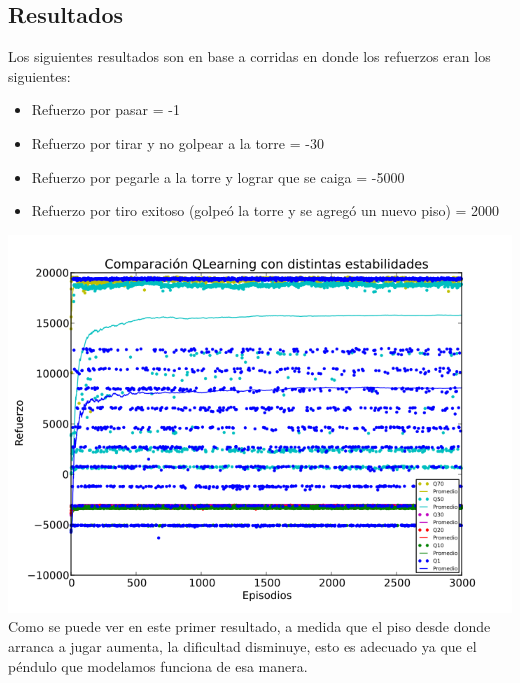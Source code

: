 \documentclass[11pt, a4paper]{article}
\begin{document}
\newpage

\subsection{Resultados}

Los siguientes resultados son en base a corridas en donde los refuerzos eran los siguientes:
\begin{itemize}
\item Refuerzo por pasar = -1
\item Refuerzo por tirar y no golpear a la torre = -30
\item Refuerzo por pegarle a la torre y lograr que se caiga = -5000
\item Refuerzo por tiro exitoso (golpe\'o la torre y se agreg\'o un nuevo piso) = 2000
\end{itemize}

\includegraphics[scale=0.6]{Graficos/estabilidadesQ}
Como se puede ver en este primer resultado, a medida que el piso desde donde arranca a jugar aumenta, la dificultad disminuye, esto es adecuado ya que el p\'endulo que modelamos funciona de esa manera.
\end{document}
